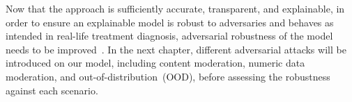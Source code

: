 \hspace*{3.5mm} Now that the approach is sufficiently accurate, transparent, and explainable, in order to ensure an explainable model is robust to adversaries and behaves as intended in real-life treatment diagnosis, adversarial robustness of the model needs to be improved~\cite{bhatt2020explainable}. In the next chapter, different adversarial attacks will be introduced on our model, including content moderation, numeric data moderation, and out-of-distribution~(OOD), before assessing the robustness against each scenario. 
